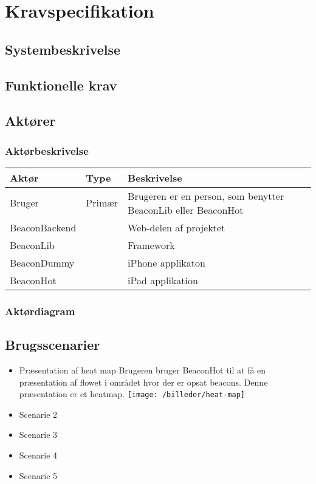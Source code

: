 \chapter{Kravspecifikation}
\label{ch:kravspecifikation}

\section{Systembeskrivelse}

\section{Funktionelle krav}
\section{Aktører}
\subsection{Aktørbeskrivelse}

\begin{table}[h]
\begin{tabular}{@{}lll@{}}
\toprule
\textbf{Aktør} & \textbf{Type} & \textbf{Beskrivelse}                                          \\ \midrule
Bruger         & Primær        & Brugeren er en person, som benytter BeaconLib eller BeaconHot \\ \midrule
BeaconBackend  &               & Web-delen af projektet                                        \\ \midrule
BeaconLib      &               & Framework                                                     \\ \midrule
BeaconDummy    &               & iPhone applikaton                                             \\ \midrule
BeaconHot      &               & iPad applikation                                              \\ \bottomrule
\end{tabular}
\end{table}

\subsection{Aktørdiagram}
\section{Brugsscenarier}
\begin{itemize}
\item Præsentation af heat map
Brugeren bruger BeaconHot til at få en præsentation af flowet i området hvor der er opsat beacons. Denne præsentation er et heatmap. 
 \texttt{[image: /billeder/heat-map]}
\item Scenarie 2 
\item Scenarie 3 
\item Scenarie 4 
\item Scenarie 5 
\end{itemize}